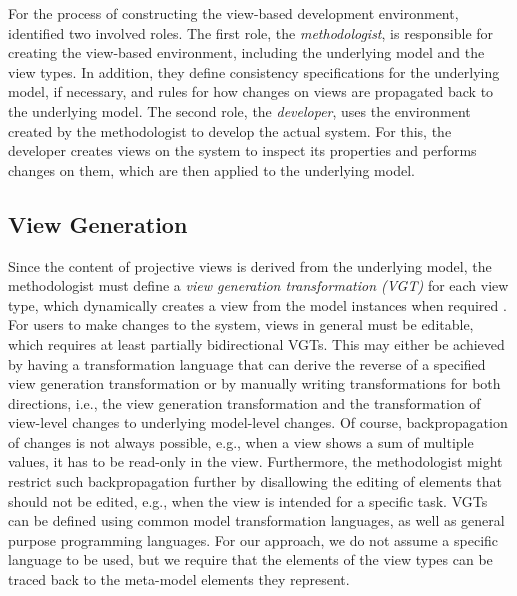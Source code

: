 For the process of constructing the view-based development environment, \textcite{atkinson_orthographic_2010} identified two involved roles.
The first role, the \emph{methodologist}, is responsible for creating the view-based environment, including the underlying model and the view types.
In addition, they define consistency specifications for the underlying model, if necessary, and rules for how changes on views are propagated back to the underlying model.
The second role, the \emph{developer}, uses the environment created by the methodologist to develop the actual system.
For this, the developer creates views on the system to inspect its properties and performs changes on them, which are then applied to the underlying model.

\subsection{View Generation}
\label{sec:ViewGeneration}

Since the content of projective views is derived from the underlying model, the methodologist must define a \emph{view generation transformation (VGT)} for each view type, which dynamically creates a view from the model instances when required \autocite{tunjic_synchronization_2015}.
For users to make changes to the system, views in general must be editable, which requires at least partially bidirectional VGTs.
This may either be achieved by having a transformation language that can derive the reverse of a specified view generation transformation or by manually writing transformations for both directions, i.e., the view generation transformation and the transformation of view-level changes to underlying model-level changes.
Of course, backpropagation of changes is not always possible, e.g., when a view shows a sum of multiple values, it has to be read-only in the view.
Furthermore, the methodologist might restrict such backpropagation further by disallowing the editing of elements that should not be edited, e.g., when the view is intended for a specific task.
VGTs can be defined using common model transformation languages, as well as general purpose programming languages.
For our approach, we do not assume a specific language to be used, but we require that the elements of the view types can be traced back to the meta-model elements they represent.

